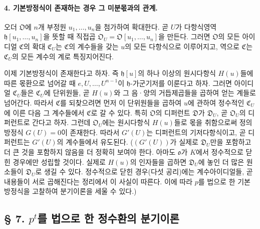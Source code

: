 \paragraph{4. 기본방정식이 존재하는 경우 그 미분몫과의 관계.}
오더 \(\mathfrak O\)에 \(n\)개 부정원 \(u_1,\ldots,u_n\)을 첨가하여 확대한다. 곧 \(U\)가 다항식영역 \(\mathfrak h[u_1,\ldots,u_n]\)을 뜻할 때 직접곱 \(\mathfrak O_U=\mathfrak O[u_1,\ldots,u_n]\)을 만든다. 그러면 \(\mathfrak O\)의 모든 아이디얼 \(\mathfrak C\)의 확대 \(\mathfrak C_U\)는 \(\mathfrak C\)의 계수들을 갖는 \(u\)의 모든 다항식으로 이루어지고, 역으로 \(\mathfrak C\)는 \(\mathfrak C_U\)의 모든 계수의 계로 특징지어진다.

이제 기본방정식이 존재한다고 하자. 즉 \(\mathfrak h[u]\)의 하나 이상의 원시다항식 \(H(u)\)들에 따른 몫환으로 넘어갈 때 \(e,U,\ldots,U^{n-1}\)이 \(\mathfrak h\)-가군기저를 이룬다고 하자. 그러면 아이디얼 \(\mathfrak C_U\)들은 \(\mathfrak C_U\)에 단위원들, 곧 \(H(u)\)와 그 음·양의 거듭제곱들을 곱하여 얻는 계들로 넘어간다. 따라서 \(\mathfrak C\)를 되찾으려면 먼저 이 단위원들을 곱하여 \(u\)에 관하여 정수적인 \(\mathfrak C_U\)에 이른 다음 그 계수들에서 \(\mathfrak C\)로 갈 수 있다. 특히 \(\mathfrak O\)의 디퍼런트 \(\mathfrak D\)가 \(\mathfrak D_U\), 곧 \(\mathfrak O_U\)의 디퍼런트로 간다고 하자. 그런데 \(\mathfrak O_U\)에는 원시다항식 \(H(u)\)들로 몫을 취함으로써 정의방정식 \(G(U)=0\)이 존재한다. 따라서 \(G'(U)\)는 디퍼런트의 기저다항식이고, 곧 디퍼런트는 \(G'(U)\)의 계수들에서 유도된다. (\((G'(U))\)가 실제로 \(\mathfrak D_U\)만을 포함하고 더 큰 것을 포함하지 않음을 더 정확히 보여야 한다. 아마도 \(\mathfrak o\)가 \(K\)에서 정수적으로 닫힌 경우에만 성립할 것이다. 실제로 \(H(u)\)의 인자들을 곱하면 \(\mathfrak D_U\)에 놓인 더 많은 원소들이 \(\mathfrak D_U\)로 생길 수 있다. 정수적으로 닫힌 경우(다섯 공리)에는 계수아이디얼들, 곧 내용들이 서로 곱해진다는 정리에서 이 사실이 따른다. 이에 따라 \(p\)를 법으로 한 기본방정식을 고찰하여 분기이론을 세울 수 있다.)

\subsection*{§ 7. \(p^t\)를 법으로 한 정수환의 분기이론}

